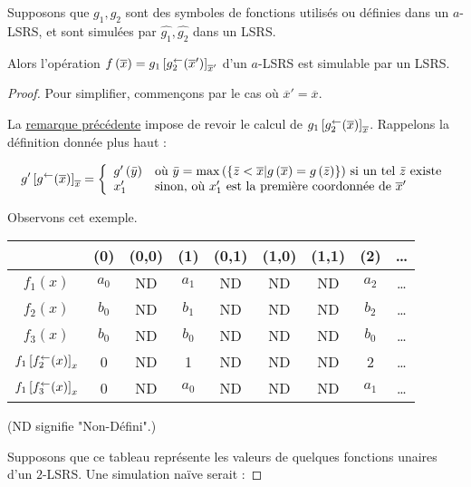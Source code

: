 	\begin{lemma}
		Supposons que $g_1, g_2$ sont des symboles de fonctions utilisés ou définies dans un $a$-LSRS, et sont simulées par $\hat{g_1},\hat{g_2}$ dans un LSRS.
		
		Alors l'opération $f\left(\overline{x}\right) = g_1\left[ g_2^{\leftarrow}(\overline{x}') \right]_{\overline{x}'}$ d'un $a$-LSRS est simulable par un LSRS.
	\end{lemma}
	
	\begin{proof}		
		Pour simplifier, commençons par le cas où $\overline{x}' = \overline{x}$. 
		
		La \hyperref[rk:fonctions_en_attente]{remarque précédente} impose de revoir le calcul de $g_1\left[ g_2^{\leftarrow}(\overline{x}) \right]_{\overline{x}}$. Rappelons la définition donnée plus haut : 
		
		\[
			g'\left[ g^{\leftarrow}(\overline{x}) \right]_{\overline{x}} = \left\lbrace \begin{array}{ll} 
				g'\left( \bar{y} \right) & \text{où $\bar{y} = \max\left( \left\lbrace \bar{z} < \overline{x} | g\left( \overline{x} \right) = g\left( \bar{z} \right) \right\rbrace \right)$ si un tel $\bar{z}$ existe} \\
				x'_1 & \text{sinon, où $x'_1$ est la première coordonnée de $\overline{x}'$}
			 \end{array} \right.
		\]
		
		Observons cet exemple.
		
		\espace 
		\begin{center}
			\begin{tabular}{|c|cccccccc|}
				\hline
									& (0)	& (0,0)	& (1)	& (0,1)	& (1,0)	& (1,1)	& (2)	& \dots \\
				\hline
				$f_1(x)$ 			& $a_0$	& ND	& $a_1$	& ND	& ND	& ND	& $a_2$	& \dots \\
				$f_2(x)$ 			& $b_0$	& ND	& $b_1$	& ND	& ND	& ND	& $b_2$	& \dots \\
				$f_3(x)$	 		& $b_0$	& ND	& $b_0$	& ND	& ND	& ND	& $b_0$	& \dots \\
				$f_1\left[ f_2^{\leftarrow}(x) \right]_{x}$
									& 0		& ND	& 1		& ND	& ND	& ND	& 2		& \dots \\
				$f_1\left[ f_3^{\leftarrow}(x) \right]_{x}$
									& 0		& ND	& $a_0$	& ND	& ND	& ND	& $a_1$	& \dots \\
				\hline 
				
			\end{tabular}
		\end{center}

			
		\espace 
		(ND signifie "Non-Défini".)
			
		Supposons que ce tableau représente les valeurs de quelques fonctions unaires d'un $2$-LSRS. Une simulation naïve serait :
		

\end{proof}
